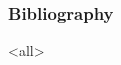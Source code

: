 \begin{frame}

\frametitle{Bibliography}
\label{bibliography}






\end{frame}

\mode<all>


\mode*

